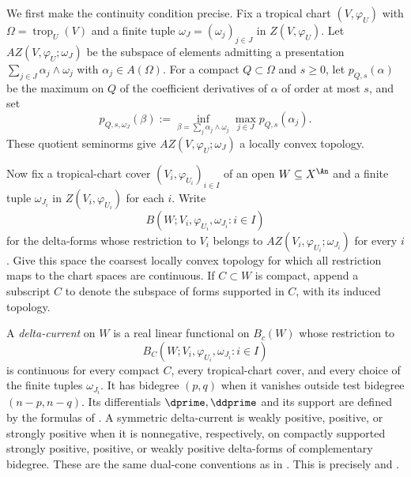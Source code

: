 We first make the continuity condition precise.  Fix a tropical chart
$(V,\varphi_U)$ with $\Omega=\operatorname{trop}_U(V)$ and a finite tuple
$\omega_J=(\omega_j)_{j\in J}$ in $Z(V,\varphi_U)$.  Let
$AZ(V,\varphi_U;\omega_J)$ be the subspace of elements admitting a
presentation $\sum_{j\in J}\alpha_j\wedge\omega_j$ with
$\alpha_j\in A(\Omega)$.  For a compact $Q\subset\Omega$ and $s\geq0$, let
$p_{Q,s}(\alpha)$ be the maximum on $Q$ of the coefficient derivatives of
$\alpha$ of order at most $s$, and set
\begin{equation}
\label{eq:ch18-delta-test-seminorm}
 p_{Q,s,\omega_J}(\beta)
 :=\inf_{\beta=\sum_j\alpha_j\wedge\omega_j}
       \max_{j\in J}p_{Q,s}(\alpha_j).
\end{equation}
These quotient seminorms give $AZ(V,\varphi_U;\omega_J)$ a locally convex
topology.

Now fix a tropical-chart cover $(V_i,\varphi_{U_i})_{i\in I}$ of an open
$W\subseteq X^{\An}$ and a finite tuple $\omega_{J_i}$ in
$Z(V_i,\varphi_{U_i})$ for each $i$.  Write
\[
 B(W;V_i,\varphi_{U_i},\omega_{J_i}:i\in I)
\]
for the delta-forms whose restriction to $V_i$ belongs to
$AZ(V_i,\varphi_{U_i};\omega_{J_i})$ for every $i$.  Give this space the
coarsest locally convex topology for which all restriction maps to the
chart spaces are continuous.  If $C\subset W$ is compact, append a subscript
$C$ to denote the subspace of forms supported in $C$, with its induced
topology.

\begin{definition}
\label{def:ch18-delta-current}
%
A \emph{delta-current} on $W$ is a real linear functional on $B_c(W)$ whose
restriction to
\[
 B_C(W;V_i,\varphi_{U_i},\omega_{J_i}:i\in I)
\]
is continuous for every compact $C$, every tropical-chart cover, and every
choice of the finite tuples $\omega_{J_i}$.  It has bidegree $(p,q)$ when it
vanishes outside test bidegree $(n-p,n-q)$.  Its differentials
$\dprime,\ddprime$ and its support are defined by the formulas of
.
A symmetric delta-current is weakly positive, positive, or strongly
positive when it is nonnegative, respectively, on compactly supported
strongly positive, positive, or weakly positive delta-forms of
complementary bidegree.  These are the same dual-cone conventions as in
.  This is precisely
\cite[Definitions~6.1--6.4]{GK17} and
\cite[Definition~2.10]{GK19}.
\end{definition}


